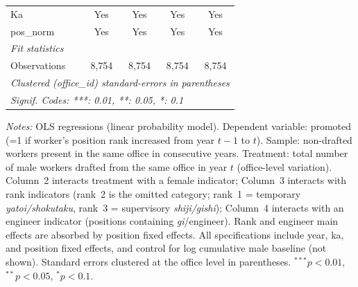 \begin{table}[htbp]
\begin{threeparttable}
\begin{tabular}{lcccc}
   Ka                             & Yes           & Yes              & Yes            & Yes\\  
   pos\_norm                      & Yes           & Yes              & Yes            & Yes\\  
   \midrule
   \emph{Fit statistics}\\
   Observations                   & 8,754         & 8,754            & 8,754          & 8,754\\  
   \midrule \midrule
   \multicolumn{5}{l}{\emph{Clustered (office\_id) standard-errors in parentheses}}\\
   \multicolumn{5}{l}{\emph{Signif. Codes: ***: 0.01, **: 0.05, *: 0.1}}\\
\end{tabular}
\begin{tablenotes}[flushleft]
\footnotesize
\item \textit{Notes:} OLS regressions (linear probability model). Dependent variable: promoted (=1 if worker's position rank increased from year $t{-}1$ to $t$). Sample: non-drafted workers present in the same office in consecutive years. Treatment: total number of male workers drafted from the same office in year $t$ (office-level variation). Column~2 interacts treatment with a female indicator; Column~3 interacts with rank indicators (rank~2 is the omitted category; rank~1 = temporary \emph{yatoi/shokutaku}, rank~3 = supervisory \emph{shiji/gishi}); Column~4 interacts with an engineer indicator (positions containing \emph{gi}/engineer). Rank and engineer main effects are absorbed by position fixed effects. All specifications include year, ka, and position fixed effects, and control for log cumulative male baseline (not shown). Standard errors clustered at the office level in parentheses. $^{***}p<0.01$, $^{**}p<0.05$, $^{*}p<0.1$.
\end{tablenotes}
\end{threeparttable}
\end{table}
